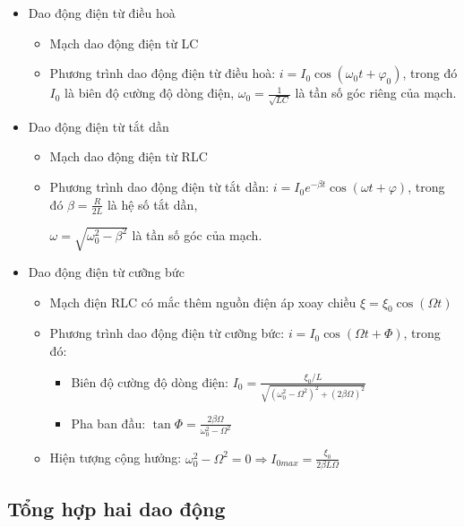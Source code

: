 \documentclass[12pt,a4paper]{article}
\begin{document}
\begin{itemize}
    \item Dao động điện từ điều hoà
    
    \begin{itemize}
        \item Mạch dao động điện từ LC
        \item Phương trình dao động điện từ điều hoà: $i = I_0 \cos(\omega_0 t + \varphi_0)$, trong đó $I_0$ là biên độ cường độ dòng điện, $\omega_0 = \frac{1}{\sqrt{LC}}$ là tần số góc riêng của mạch.
    \end{itemize}

    \item Dao động điện từ tắt dần
    \begin{itemize}
        \item Mạch dao động điện từ RLC
        \item Phương trình dao động điện từ tắt dần: $i = I_0 e^{-\beta t} \cos(\omega t + \varphi)$, trong đó $\beta = \frac{R}{2L}$ là hệ số tắt dần,
        
        $\omega = \sqrt{\omega_0^2 - \beta^2}$ là tần số góc của mạch.
    \end{itemize}

    \item Dao động điện từ cưỡng bức
    \begin{itemize}
        \item Mạch điện RLC có mắc thêm nguồn điện áp xoay chiều $\xi = \xi_0 \cos(\Omega t)$
        \item Phương trình dao động điện từ cưỡng bức: $i = I_0 \cos(\Omega t + \Phi)$, trong đó: 
        \begin{itemize}
            \item Biên độ cường độ dòng điện: $I_0 = \frac{\xi_0 / L}{\sqrt{(\omega_0^2 - \Omega^2)^2 + (2\beta \Omega)^2}}$
            \item Pha ban đầu: $\tan \Phi = \frac{2\beta \Omega}{\omega_0^2 - \Omega^2}$
        \end{itemize}
        \item Hiện tượng cộng hưởng: $\omega_0^2 - \Omega^2 = 0 \Rightarrow I_{0max} = \frac{\xi_0}{2\beta L \Omega}$
    \end{itemize}
\end{itemize}

\subsection*{Tổng hợp hai dao động}
\end{document}
